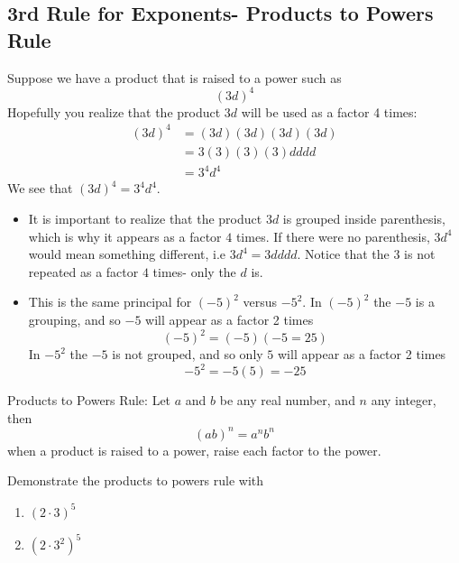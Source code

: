 \subsection{3rd Rule for Exponents- Products to Powers Rule}
Suppose we have a product that is raised to a power such as
\[
	(3d)^4
\]
Hopefully you realize that the product $3d$ will be used as a factor 4 times:
\begin{align*}
	(3d)^4 & =		(3d)(3d)(3d)(3d) \\
	       & =		3(3)(3)(3)dddd   \\
	       & =		3^4d^4           
\end{align*}
We see that $(3d)^4 = 3^4 d^4$. 
\begin{itemize}
	\item It is important to realize that the product $3d$ is grouped inside 
	parenthesis, which is why it appears as a factor $4$ times. If there were
	no parenthesis, $3d^4$ would mean something different, i.e $3d^4 = 3 dddd$. Notice
	that the $3$ is not repeated as a factor $4$ times- only the $d$ is.
	\item This is the same principal for $(-5)^2$ versus $-5^2$. In $(-5)^2$ the $-5$ is 
	a grouping, and so $-5$ will appear as a factor 2 times
	\[
		(-5)^2 = (-5)(-5 = 25)
	\]
	In $-5^2$ the $-5$ is not grouped, and so only $5$ will appear as a factor 2 times
	\[
		-5^2 = -5(5) = -25
	\]
\end{itemize}
\begin{myDefinition}
	Products to Powers Rule: Let $a$ and $b$ be any real number, and $n$ any integer,
	then
	\[
		(ab)^n = a^n b^n
	\]
	when a product is raised to a power, raise each factor to the power.
\end{myDefinition}
\begin{myexample}
Demonstrate the products to powers rule with
\begin{multicols}{2}
	\begin{enumerate}
		\item $(2 \cdot 3)^5$
		\item $(2\cdot 3^2)^5$
	\end{enumerate}	
\end{multicols}
\end{myexample}

